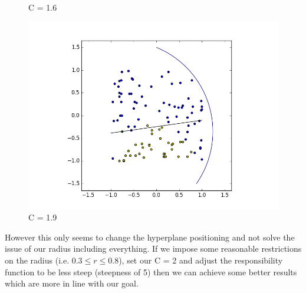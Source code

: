 \documentclass[notitlepage]{report}
\theoremstyle{definition}
\begin{document}
\begin{figure}[H]
\begin{minipage}[b]{0.49\textwidth}
    \caption{C = 1.6}
  \end{minipage}
  \hfill
  \begin{minipage}[b]{0.49\textwidth}
    \includegraphics[width=\textwidth]{BoundaryHunter-Attempt3-04.png}
    \caption{C = 1.9}
  \end{minipage}
\end{figure}

However this only seems to change the hyperplane positioning and not solve the issue of our radius including everything. If we impose some reasonable restrictions on the radius (i.e. $0.3 \leq r \leq 0.8$), set our C = 2 and adjust the responsibility function to be less steep (steepness of 5) then we can achieve some better results which are more in line with our goal.
\end{document}
